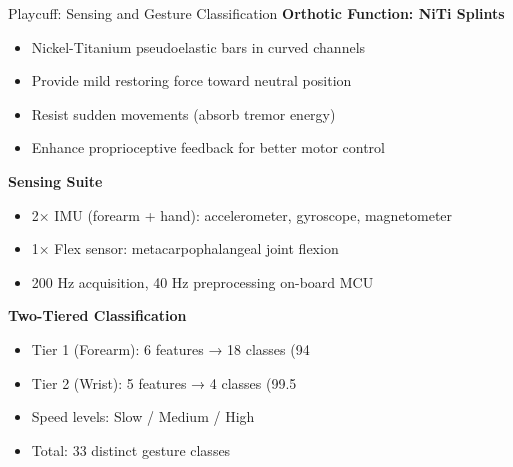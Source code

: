\begin{frame}{Playcuff: Sensing and Gesture Classification}
	\textbf{\textcolor{gbAqua}{Orthotic Function: NiTi Splints}}
	
	\begin{itemize}
		\item Nickel-Titanium pseudoelastic bars in curved channels
		\item Provide mild restoring force toward neutral position
		\item Resist sudden movements (absorb tremor energy)
		\item Enhance proprioceptive feedback for better motor control
	\end{itemize}
	
	\vspace{0.3cm}
	
	\textbf{\textcolor{gbAqua}{Sensing Suite}}
	
	\begin{itemize}
		\item 2× IMU (forearm + hand): accelerometer, gyroscope, magnetometer
		\item 1× Flex sensor: metacarpophalangeal joint flexion
		\item 200 Hz acquisition, 40 Hz preprocessing on-board MCU
	\end{itemize}
	
	\vspace{0.3cm}
	
	\textbf{\textcolor{gbAqua}{Two-Tiered Classification}}
	
	\begin{itemize}
		\item Tier 1 (Forearm): 6 features → 18 classes (94%
		\item Tier 2 (Wrist): 5 features → 4 classes (99.5%
		\item Speed levels: Slow / Medium / High
		\item Total: 33 distinct gesture classes
	\end{itemize}
	
\end{frame}

